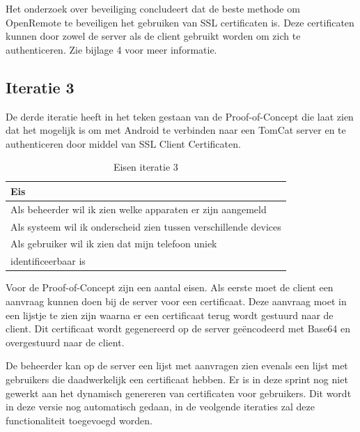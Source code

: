 \documentclass[]{article}
\begin{document}
Het onderzoek over beveiliging concludeert dat de beste methode om
OpenRemote te beveiligen het gebruiken van SSL certificaten is. Deze
certificaten kunnen door zowel de server als de client gebruikt worden om
zich te authenticeren. Zie bijlage 4 voor meer informatie.

\subsection{Iteratie 3}
De derde iteratie heeft in het teken gestaan van de Proof-of-Concept die laat zien
dat het mogelijk is om met Android te verbinden naar een TomCat server en
te authenticeren door middel van SSL Client Certificaten.

\begin{table}[htpb]
  \caption{Eisen iteratie 3}
  \begin{center}
    \begin{tabular}{|| l ||}\hline
        Eis                                                              \\\hline\hline
        Als beheerder wil ik zien welke apparaten er zijn aangemeld      \\\hline
        Als systeem wil ik onderscheid zien tussen verschillende devices \\\hline
        Als gebruiker wil ik zien dat mijn telefoon uniek                \\ 
        identificeerbaar is                                              \\\hline
    \end{tabular}                                                         
  \end{center}                                                            
\end{table}                                                               

Voor de Proof-of-Concept zijn een aantal eisen. Als eerste moet de client
een aanvraag kunnen doen bij de server voor een certificaat. Deze aanvraag
moet in een lijstje te zien zijn waarna er een certificaat terug wordt
gestuurd naar de client. Dit certificaat wordt gegenereerd op de server
ge\"encodeerd met Base64 en overgestuurd naar de client.

De beheerder kan op de server een lijst met aanvragen zien evenals een
lijst met gebruikers die daadwerkelijk een certificaat hebben. Er is in deze
sprint nog niet gewerkt aan het dynamisch genereren van certificaten voor
gebruikers. Dit wordt in deze versie nog automatisch gedaan, in de veolgende
iteraties zal deze functionaliteit toegevoegd worden.
\end{document}
